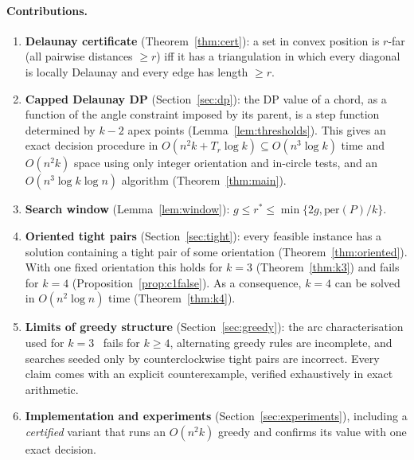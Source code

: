 \documentclass[11pt,a4paper]{article}
\theoremstyle{definition}
\newcommand{\opt}{r^{*}}
\begin{document}
\paragraph{Contributions.}
\begin{enumerate}[leftmargin=*]
\item \textbf{Delaunay certificate} (Theorem~\ref{thm:cert}): a set in convex
  position is $r$-far (all pairwise distances $\ge r$) iff it has a
  triangulation in which every diagonal is locally Delaunay and every edge has
  length $\ge r$.
\item \textbf{Capped Delaunay DP} (Section~\ref{sec:dp}): the DP value of a
  chord, as a function of the angle constraint imposed by its parent, is a step
  function determined by $k-2$ apex points (Lemma~\ref{lem:thresholds}). This
  gives an exact decision procedure in $O(n^2k+T_r\log k)\subseteq O(n^3\log
  k)$ time and $O(n^2k)$ space using only integer orientation and in-circle
  tests, and an $O(n^3\log k\log n)$ algorithm (Theorem~\ref{thm:main}).
\item \textbf{Search window} (Lemma~\ref{lem:window}):
  $g\le\opt\le\min\{2g,\mathrm{per}(P)/k\}$.
\item \textbf{Oriented tight pairs} (Section~\ref{sec:tight}): every feasible
  instance has a solution containing a tight pair of some orientation
  (Theorem~\ref{thm:oriented}). With one fixed orientation this holds for $k=3$
  (Theorem~\ref{thm:k3}) and fails for $k=4$ (Proposition~\ref{prop:c1false}).
  As a consequence, $k=4$ can be solved in $O(n^2\log n)$ time
  (Theorem~\ref{thm:k4}).
\item \textbf{Limits of greedy structure} (Section~\ref{sec:greedy}): the arc
  characterisation used for $k=3$~\cite{Kob21,TW25} fails for $k\ge4$,
  alternating greedy rules are incomplete, and searches seeded only by
  counterclockwise tight pairs are incorrect. Every claim comes with an explicit
  counterexample, verified exhaustively in exact arithmetic.
\item \textbf{Implementation and experiments} (Section~\ref{sec:experiments}),
  including a \emph{certified} variant that runs an $O(n^2k)$ greedy and
  confirms its value with one exact decision.
\end{enumerate}
\end{document}
